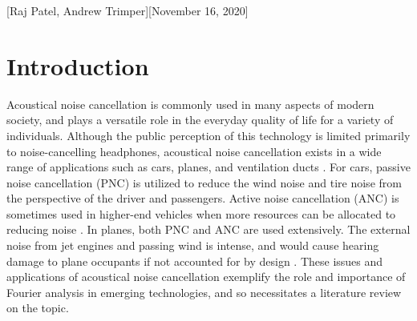 \documentclass[11pt]{article}
\begin{document}
[Raj Patel, Andrew Trimper][November 16, 2020]

\begin{abstract}
{Acoustics, Active Noise Cancellation, Adaptive Filter, Digital Signal Processing (DSP), Feedforward Control, Fourier Analysis, Passive Noise Cancellation}
Noise cancellation is the process by which noise impacting a system is nullified in order to improve system functionality. Noise cancellation technology is wide-ranging in applications, and has seen use in acoustics, radio-frequency (RF), and electronics, among other spaces. This review focuses on the application of noise cancellation in the acoustical realm. The topic is first introduced broadly to give scope to the importance of noise cancellation as it applies to acoustics. Acoustical noise cancellation is then broken down into two variants: passive noise cancellation (PNC) and active noise cancellation (ANC). ANC is studied significantly in this review which reflects the distribution of state-of-the-art literature across these two variants. Fourier analysis is presented as a tool used to enable certain ANC methods. A more popular adaptive ANC algorithm, Filtered-x Least Mean Square (FXLMS), is examined in detail to provide a glimpse of advances in acoustical noise cancellation. Finally, the applications of noise cancellation are discussed. The goals of this review are to provide a background and delineate the role of Fourier analysis in acoustical noise cancellation. The interplay between Fourier analysis and acoustical noise cancellation is essential, as many advances in the field of acoustical noise cancellation have come as its direct result.
\end{abstract}

\tableofcontents

\section{Introduction}

Acoustical noise cancellation is commonly used in many aspects of modern society, and plays a versatile role in the everyday quality of life for a variety of individuals. Although the public perception of this technology is limited primarily to noise-cancelling headphones, acoustical noise cancellation exists in a wide range of applications such as cars, planes, and ventilation ducts \cite{kuo}. For cars, passive noise cancellation (PNC) is utilized to reduce the wind noise and tire noise from the perspective of the driver and passengers. Active noise cancellation (ANC) is sometimes used in higher-end vehicles when more resources can be allocated to reducing noise \cite{chen}. In planes, both PNC and ANC are used extensively. The external noise from jet engines and passing wind is intense, and would cause hearing damage to plane occupants if not accounted for by design \cite{roy}. These issues and applications of acoustical noise cancellation exemplify the role and importance of Fourier analysis in emerging technologies, and so necessitates a literature review on the topic.
\end{document}
